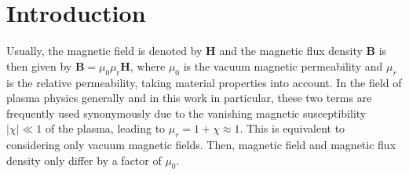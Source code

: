 \section{Introduction}
\label{sec:introduction}

Usually,
the magnetic field is denoted by $\mathbf{H}$ and
the magnetic flux density $\mathbf{B}$ is then given by $\mathbf{B} = \mu_0 \mu_\mathrm{r} \mathbf{H}$,
where $\mu_0$ is the vacuum magnetic permeability
and $\mu_r$ is the relative permeability, taking material properties into account.
In the field of plasma physics generally and in this work in particular,
these two terms are frequently used synonymously
due to the vanishing magnetic susceptibility $|\chi| \ll 1$ of the plasma,
leading to $\mu_r = 1+\chi \approx 1$.
This is equivalent to considering only vacuum magnetic fields.
Then, magnetic field and magnetic flux density only differ by a factor of $\mu_0$.

